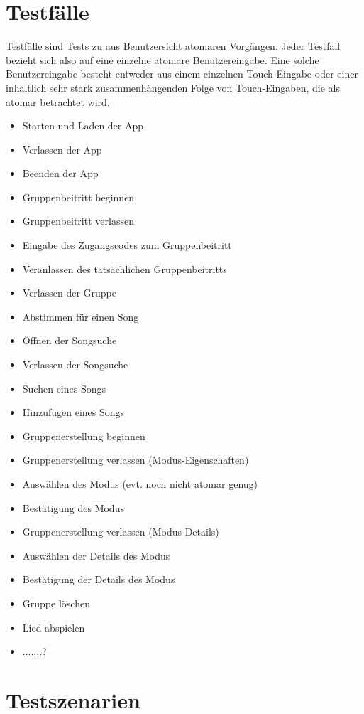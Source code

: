 \documentclass[oneside, ngerman]{sdqtechreport}
\begin{document}
\section{Testfälle}
\label{sec:Tests:Testfälle}

Testfälle sind Tests zu aus Benutzersicht atomaren Vorgängen. Jeder Testfall bezieht sich also auf eine einzelne atomare Benutzereingabe. Eine solche Benutzereingabe besteht entweder aus einem einzelnen Touch-Eingabe oder einer inhaltlich sehr stark zusammenhängenden Folge von Touch-Eingaben, die als atomar betrachtet wird.

\begin{itemize}
    \item Starten und Laden der App
    \item Verlassen der App
    \item Beenden der App
    \item Gruppenbeitritt beginnen
    \item Gruppenbeitritt verlassen
    \item Eingabe des Zugangscodes zum Gruppenbeitritt
    \item Veranlassen des tatsächlichen Gruppenbeitritts
    \item Verlassen der Gruppe
    \item Abstimmen für einen Song
    \item Öffnen der Songsuche
    \item Verlassen der Songsuche
    \item Suchen eines Songs
    \item Hinzufügen eines Songs
    \item Gruppenerstellung beginnen
    \item Gruppenerstellung verlassen (Modus-Eigenschaften)
    \item Auswählen des Modus (evt. noch nicht atomar genug)
    \item Bestätigung des Modus
    \item Gruppenerstellung verlassen (Modus-Details)
    \item Auswählen der Details des Modus
    \item Bestätigung der Details des Modus
    \item Gruppe löschen
    \item Lied abspielen
    \item .......?
\end{itemize}

\section{Testszenarien}
\label{sec:Tests:Testszenarien}
\end{document}

